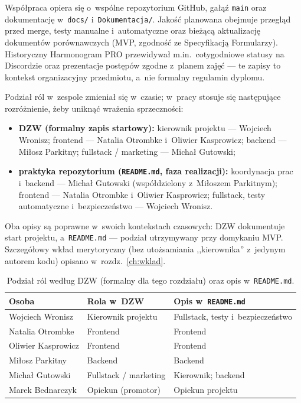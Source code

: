 \documentclass{sprz}
\begin{document}
Współpraca opiera się o~wspólne repozytorium GitHub, gałąź \texttt{main} oraz dokumentację w~\texttt{docs/} i~\texttt{Dokumentacja/}. Jakość planowana obejmuje przegląd przed merge, testy manualne i~automatyczne oraz bieżącą aktualizację dokumentów porównawczych (MVP, zgodność ze Specyfikacją Formularzy). Historyczny Harmonogram PRO przewidywał m.in.\ cotygodniowe statusy na Discordzie oraz prezentacje postępów zgodne z~planem zajęć --- te zapisy to kontekst organizacyjny przedmiotu, a~nie formalny regulamin dyplomu.

Podział ról w~zespole zmieniał się w~czasie; w~pracy stosuje się następujące rozróżnienie, żeby uniknąć wrażenia sprzeczności:
\begin{itemize}
  \item \textbf{DZW (formalny zapis startowy):} kierownik projektu --- Wojciech Wronisz; frontend --- Natalia Otrombke i~Oliwier Kasprowicz; backend --- Miłosz Parkitny; fullstack / marketing --- Michał Gutowski;
  \item \textbf{praktyka repozytorium (\texttt{README.md}, faza realizacji):} koordynacja prac i~backend --- Michał Gutowski (współdzielony z~Miłoszem Parkitnym); frontend --- Natalia Otrombke i~Oliwier Kasprowicz; fullstack, testy automatyczne i~bezpieczeństwo --- Wojciech Wronisz.
\end{itemize}
Oba opisy są poprawne w~swoich kontekstach czasowych: DZW dokumentuje start projektu, a~\texttt{README.md} --- podział utrzymywany przy domykaniu MVP. Szczegółowy wkład merytoryczny (bez utożsamiania ,,kierownika'' z~jedynym autorem kodu) opisano w~rozdz.~\ref{ch:wklad}.

\begin{table}[ht]
  \centering
  \caption{Podział ról według DZW (formalny dla tego rozdziału) oraz opis w~\texttt{README.md}.}
  \label{tab:role-zespolu}
  \begin{tabularx}{\linewidth}{|>{\raggedright\arraybackslash}X|>{\raggedright\arraybackslash}X|>{\raggedright\arraybackslash}X|}
    \hline
    \textbf{Osoba} & \textbf{Rola w~DZW} & \textbf{Opis w~\texttt{README.md}} \\
    \hline
    Wojciech Wronisz & Kierownik projektu & Fullstack, testy i~bezpieczeństwo \\
    \hline
    Natalia Otrombke & Frontend & Frontend \\
    \hline
    Oliwier Kasprowicz & Frontend & Frontend \\
    \hline
    Miłosz Parkitny & Backend & Backend \\
    \hline
    Michał Gutowski & Fullstack / marketing & Kierownik; backend \\
    \hline
    Marek Bednarczyk & Opiekun (promotor) & Opiekun projektu \\
    \hline
  \end{tabularx}
\end{table}
\end{document}
